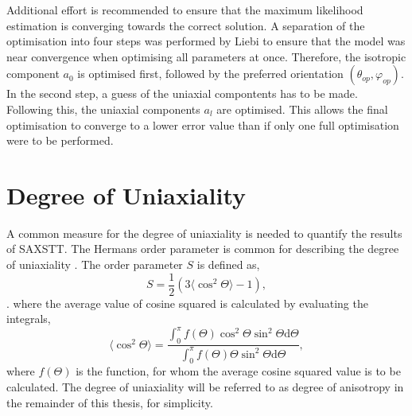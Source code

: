 Additional effort is recommended to ensure that the maximum likelihood estimation is converging towards the correct solution.
A separation of the optimisation into four steps was performed by Liebi \cite{liebi2018small} to ensure that the model was near convergence when optimising all parameters at once.
Therefore, the isotropic component $a_{0}$ is optimised first, followed by the preferred orientation $(\theta_{op}, \varphi_{op})$. In the second step, a guess of the uniaxial compontents has to be made.
Following this, the uniaxial components $a_{l}$ are optimised.
This allows the final optimisation to converge to a lower error value than if only one full optimisation were to be performed.


\section{Degree of Uniaxiality} %

A common measure for the degree of uniaxiality is needed to quantify the results of SAXSTT.
The Hermans order parameter is common for describing the degree of uniaxiality \cite{yoshiharu1997cellulose}.
The order parameter $S$ is defined as,
\begin{equation}\label{eq:hermans_order_parameter}
    S = \frac{1}{2} \left( 3 \langle\cos^{2} \Theta\rangle - 1 \right),
\end{equation}.
\noindent
where the average value of cosine squared is calculated by evaluating the integrals,
\begin{equation}
    \langle\cos^{2} \Theta\rangle = \frac{ \int_{0}^{\pi} f (\Theta) \cos^{2} \Theta \sin^{2} \Theta  \mathrm{d}\Theta  }
    {\int_{0}^{\pi} f (\Theta) \Theta \sin^{2} \Theta  \mathrm{d}\Theta },
\end{equation}
\noindent
where $f(\Theta)$ is the function, for whom the average cosine squared value is to be calculated.
The degree of uniaxiality will be referred to as degree of anisotropy in the remainder of this thesis, for simplicity.

